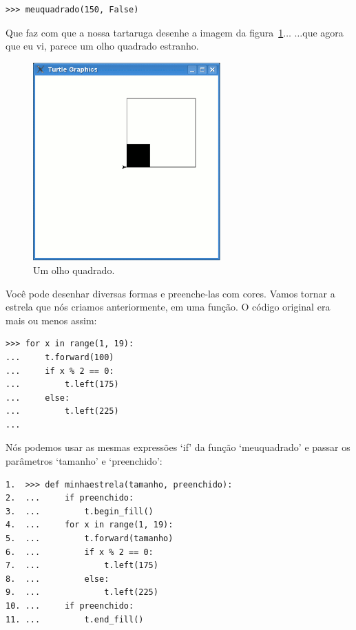 {\begin{listing}
\begin{verbatim}
>>> meuquadrado(150, False)
\end{verbatim}
\end{listing}

\noindent
Que faz com que a nossa tartaruga desenhe a imagem da figura~\ref{fig28}$\ldots$ $\ldots$que agora que eu vi, parece um olho quadrado estranho.

\begin{figure}
\begin{center}
\includegraphics[width=72mm]{eps/figure28.eps}
\end{center}
\caption{Um olho quadrado.}\label{fig28}
\end{figure}

Você pode desenhar diversas formas e preenche-las com cores. Vamos tornar a estrela que nós criamos anteriormente, em uma função. O código original era mais ou menos assim:

\begin{listing}
\begin{verbatim}
>>> for x in range(1, 19):
...     t.forward(100)
...     if x % 2 == 0:
...         t.left(175)
...     else:
...         t.left(225)
...
\end{verbatim}
\end{listing}

Nós podemos usar as mesmas expressões `if' da função `meuquadrado' e passar os parâmetros `tamanho' e `preenchido':

\begin{listing}
\begin{verbatim}
1.  >>> def minhaestrela(tamanho, preenchido):
2.  ...     if preenchido:
3.  ...         t.begin_fill()
4.  ...     for x in range(1, 19):
5.  ...         t.forward(tamanho)
6.  ...         if x % 2 == 0:
7.  ...             t.left(175)
8.  ...         else:
9.  ...             t.left(225)
10. ...     if preenchido:
11. ...         t.end_fill()
\end{verbatim}
\end{listing}

}
